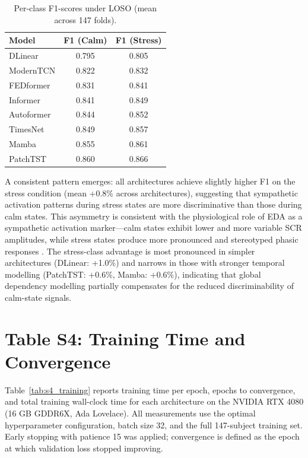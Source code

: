 \documentclass[runningheads]{llncs}
\begin{document}
\begin{table}[ht]
\centering
\caption{Per-class F1-scores under LOSO (mean across 147 folds).}
\label{tab:s3_perclass}
\begin{tabular}{lcc}
\toprule
Model & F1 (Calm) & F1 (Stress) \\
\midrule
DLinear   & 0.795 & 0.805 \\
ModernTCN & 0.822 & 0.832 \\
FEDformer  & 0.831 & 0.841 \\
Informer  & 0.841 & 0.849 \\
Autoformer & 0.844 & 0.852 \\
TimesNet  & 0.849 & 0.857 \\
Mamba     & 0.855 & 0.861 \\
PatchTST   & 0.860 & 0.866 \\
\bottomrule
\end{tabular}
\end{table}

A consistent pattern emerges: all architectures achieve slightly higher F1 on the stress condition (mean +0.8\% across architectures), suggesting that sympathetic activation patterns during stress states are more discriminative than those during calm states. This asymmetry is consistent with the physiological role of EDA as a sympathetic activation marker---calm states exhibit lower and more variable SCR amplitudes, while stress states produce more pronounced and stereotyped phasic responses \cite{LongTermVariability}. The stress-class advantage is most pronounced in simpler architectures (DLinear: +1.0\%) and narrows in those with stronger temporal modelling (PatchTST: +0.6\%, Mamba: +0.6\%), indicating that global dependency modelling partially compensates for the reduced discriminability of calm-state signals.

\section*{Table S4: Training Time and Convergence}

Table~\ref{tab:s4_training} reports training time per epoch, epochs to convergence, and total training wall-clock time for each architecture on the NVIDIA RTX 4080 (16 GB GDDR6X, Ada Lovelace). All measurements use the optimal hyperparameter configuration, batch size 32, and the full 147-subject training set. Early stopping with patience 15 was applied; convergence is defined as the epoch at which validation loss stopped improving.
\end{document}
